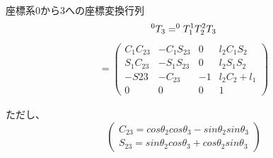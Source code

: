 \documentclass[a4j]{jarticle}			%
\begin{document}
\begin{multicols}{2} %
座標系0から3への座標変換行列 
$$
	^{0}T_{3}=^{0}T_{1} ^{1}T_{2} ^{2}T_{3} \\
$$
\begin{equation*}
	\begin{array}{cc}
		=
		\left( 
			\begin{array}{cccc}
				C_1C_{23} & -C_1S_{23} & 0 & l_2C_1S_2 \\
				S_1C_{23} & -S_1S_{23} & 0 & l_2S_1S_2 \\
				-S{23} & -C_{23} & -1 & l_2C_2 + l_1 \\
				0 & 0 & 0 & 1 
			\end{array}
		\right)
	\end{array}
\end{equation*}

ただし、
\begin{equation*}
	\left(
	\begin{split}
		C_{23} = cos\theta_2cos\theta_3-sin\theta_2sin\theta_3\\
		S_{23} = sin\theta_2cos\theta_3+cos\theta_2sin\theta_3	
	\end{split}
	\right)
\end{equation*}


\end{multicols}
\end{document}
